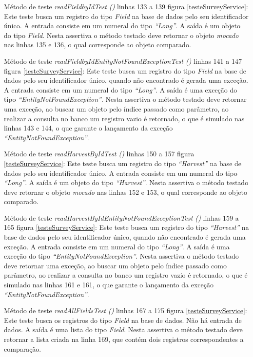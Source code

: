 Método de teste \textit{ readFieldbyIdTest ()} linhas 133 a 139 figura \ref{testeSurveyService}: Este teste busca um registro do tipo \textit{Field} na base de dados pelo seu identificador único. A entrada consiste em um numeral do tipo \textit{“Long”}. A saída é um objeto do tipo \textit{Field}. Nesta assertiva o método testado deve retornar o objeto \textit{mocado} nas linhas 135 e 136, o qual corresponde ao objeto comparado.

Método de teste \textit{ readFieldbyIdEntityNotFoundExceptionTest ()} linhas 141 a 147 figura \ref{testeSurveyService}: Este teste busca um registro do tipo \textit{Field} na base de dados pelo seu identificador único, quando não encontrado é gerada uma exceção. A entrada consiste em um numeral do tipo \textit{“Long”}. A saída é uma exceção do tipo \textit{“EntityNotFoundException”}. Nesta assertiva o método testado deve retornar uma exceção, ao buscar um objeto pelo índice passado como parâmetro, ao realizar a consulta no banco um registro vazio é retornado, o que é simulado nas linhas 143 e 144, o que garante o lançamento da exceção \textit{“EntityNotFoundException”}.

Método de teste \textit{ readHarvestByIdTest ()} linhas 150 a 157 figura \ref{testeSurveyService}: Este teste busca um registro do tipo \textit{“Harvest”} na base de dados pelo seu identificador único. A entrada consiste em um numeral do tipo \textit{“Long”}. A saída é um objeto do tipo \textit{“Harvest”}. Nesta assertiva o método testado deve retornar o objeto \textit{mocado} nas linhas 152 e 153, o qual corresponde ao objeto comparado.

Método de teste \textit{ readHarvestByIdEntityNotFoundExceptionTest ()} linhas 159 a 165 figura \ref{testeSurveyService}: Este teste busca um registro do tipo \textit{“Harvest”} na base de dados pelo seu identificador único, quando não encontrado é gerada uma exceção. A entrada consiste em um numeral do tipo \textit{“Long”}. A saída é uma exceção do tipo \textit{“EntityNotFoundException”}. Nesta assertiva o método testado deve retornar uma exceção, ao buscar um objeto pelo índice passado como parâmetro, ao realizar a consulta no banco um registro vazio é retornado, o que é simulado nas linhas 161 e 161, o que garante o lançamento da exceção \textit{“EntityNotFoundException”}.

Método de teste \textit{ readAllFieldsTest ()} linhas 167 a 175 figura \ref{testeSurveyService}: Este teste busca os registros do tipo \textit{Field} na base de dados. Não há entrada de dados.  A saída é uma lista do tipo \textit{Field}. Nesta assertiva o método testado deve retornar a lista criada na linha 169, que contém dois registros correspondentes a comparação.

